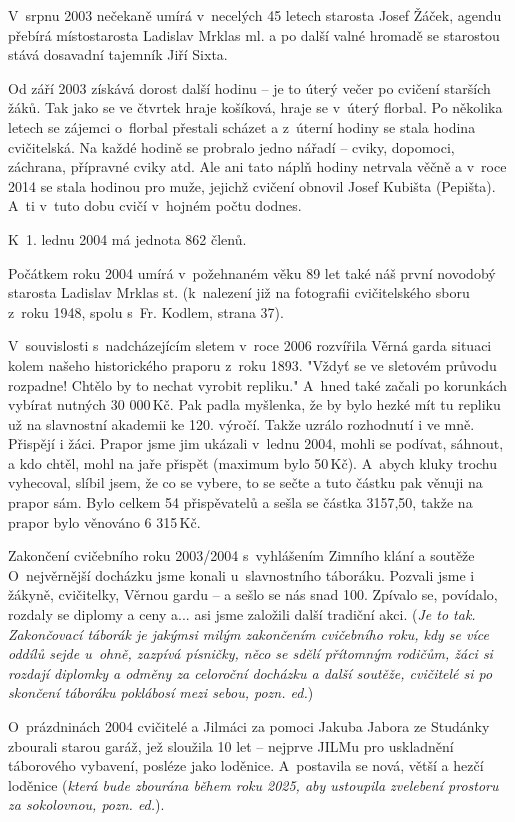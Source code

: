 \documentclass[a5paper, 11pt, twoside]{article}
\begin{document}
V~srpnu 2003 nečekaně umírá v~necelých 45 letech starosta Josef Žáček,
agendu přebírá místostarosta Ladislav Mrklas ml. a po další valné
hromadě se starostou stává dosavadní tajemník Jiří Sixta.

Od září 2003 získává dorost další hodinu -- je to úterý večer po cvičení
starších žáků. Tak jako se ve čtvrtek hraje košíková, hraje se v~úterý
florbal. Po několika letech se zájemci o~florbal přestali scházet a
z~úterní hodiny se stala hodina cvičitelská. Na každé hodině se probralo
jedno nářadí -- cviky, dopomoci, záchrana, přípravné cviky atd. Ale ani
tato náplň hodiny netrvala věčně a v~roce 2014 se stala hodinou pro
muže, jejichž cvičení obnovil Josef Kubišta (Pepišta). A~ti v~tuto dobu
cvičí v~hojném počtu dodnes.

K~1. lednu 2004 má jednota 862 členů.

Počátkem roku 2004 umírá v~požehnaném věku 89 let také náš první
novodobý starosta Ladislav Mrklas st. (k~nalezení již na fotografii
cvičitelského sboru z~roku 1948, spolu s~Fr. Kodlem, strana 37). %

V~souvislosti s~nadcházejícím sletem v~roce 2006 rozvířila Věrná garda
situaci kolem našeho historického praporu z~roku 1893. "Vždyť se ve
sletovém průvodu rozpadne! Chtělo by to nechat vyrobit repliku." A~hned
také začali po korunkách vybírat nutných 30 000\,Kč. Pak padla myšlenka,
že by bylo hezké mít tu repliku už na slavnostní akademii ke 120.
výročí. Takže uzrálo rozhodnutí i ve mně. Přispějí i žáci. Prapor jsme
jim ukázali v~lednu 2004, mohli se podívat, sáhnout, a kdo chtěl, mohl
na jaře přispět (maximum bylo 50\,Kč). A~abych kluky trochu vyhecoval,
slíbil jsem, že co se vybere, to se sečte a tuto částku pak věnuji na
prapor sám. Bylo celkem 54 přispěvatelů a sešla se částka 3157,50, takže
na prapor bylo věnováno 6 315\,Kč.

Zakončení cvičebního roku 2003/2004 s~vyhlášením Zimního klání a soutěže
O~nejvěrnější docházku jsme konali u~slavnostního táboráku. Pozvali jsme
i žákyně, cvičitelky, Věrnou gardu -- a sešlo se nás snad 100. Zpívalo
se, povídalo, rozdaly se diplomy a ceny a... asi jsme založili další
tradiční akci. (\textit{Je to tak. Zakončovací táborák je jakýmsi milým
zakončením cvičebního roku, kdy se více oddílů sejde u~ohně, zazpívá
písničky, něco se sdělí přítomným rodičům, žáci si rozdají diplomky a
odměny za celoroční docházku a další soutěže, cvičitelé si po skončení
táboráku poklábosí mezi sebou, pozn. ed.})

O~prázdninách 2004 cvičitelé a Jilmáci za pomoci Jakuba Jabora ze
Studánky zbourali starou garáž, jež sloužila 10 let -- nejprve JILMu pro
uskladnění táborového vybavení, posléze jako loděnice. A~postavila se
nová, větší a hezčí loděnice (\textit{která bude zbourána během roku 2025,
aby ustoupila zvelebení prostoru za sokolovnou, pozn. ed.}).
\end{document}
